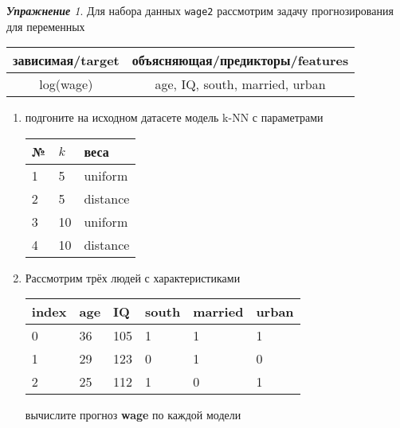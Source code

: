 \documentclass[a4,12pt]{article}
\theoremstyle{remark}
\newtheorem{exercise}{\textbf{Упражнение}}[section]
\begin{document}
\begin{exercise}
Для набора данных \texttt{wage2} рассмотрим задачу прогнозирования
для переменных
\begin{center}
	\begin{tabular}{|c|c|}\hline
		зависимая/target & объясняющая/предикторы/features \\ \hline
		log(wage) & age, IQ, south, married, urban \\ \hline
	\end{tabular}
\end{center}
\begin{enumerate}
	\item подгоните на исходном датасете модель k-NN с параметрами
	\begin{center}
		\begin{tabular}{|l|l|l|}\hline
		№ & \(k\) & веса \\ \hline
		1 & 5 & uniform \\
		2 & 5 & distance \\
		3 & 10 & uniform \\
		4 & 10 & distance \\ \hline
		\end{tabular}
	\end{center}
	\item Рассмотрим трёх людей с характеристиками
	\begin{center}
		\begin{tabular}{|l||l|l|l|l|l|}\hline
			index & age & IQ & south & married & urban \\ \hline\hline
			0 & 36 & 105 & 1 & 1 & 1 \\
			1 & 29 & 123 & 0 & 1 & 0 \\
			2 & 25 & 112 & 1 & 0 & 1 \\ \hline
		\end{tabular}
	\end{center}
	вычислите прогноз \textbf{wage} по каждой модели
\end{enumerate}
\end{exercise}
\end{document}
